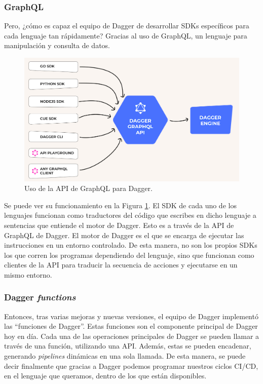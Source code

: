 \subsubsection*{GraphQL}

Pero, ¿cómo es capaz el equipo de Dagger de desarrollar SDKs específicos para cada lenguaje tan rápidamente? Gracias al uso de GraphQL\cite{graphql}, un lenguaje para manipulación y consulta de datos.

\begin{figure}
  \centerline{\includegraphics[width=14cm]{figuras/graphql}}
  \caption{Uso de la API de GraphQL para Dagger.\cite{img:graphql}}
  \label{fig:graphql}
\end{figure}

Se puede ver su funcionamiento en la Figura \ref{fig:graphql}. El SDK de cada uno de los lenguajes funcionan como traductores del código que escribes en dicho lenguaje a sentencias que entiende el motor de Dagger. Esto es a través de la API de GraphQL de Dagger. El motor de Dagger es el que se encarga de ejecutar las instrucciones en un entorno controlado. De esta manera, no son los propios SDKs los que corren los programas dependiendo del lenguaje, sino que funcionan como clientes de la API para traducir la secuencia de acciones y ejecutarse en un mismo entorno.

\subsubsection*{Dagger \textit{functions}}

Entonces, tras varias mejoras y nuevas versiones, el equipo de Dagger implementó las ``funciones de Dagger''. Estas funciones son el componente principal de Dagger hoy en día. Cada una de las operaciones principales de Dagger se pueden llamar a través de una función, utilizando una API. Además, estas se pueden encadenar, generando \textit{pipelines} dinámicas en una sola llamada. De esta manera, se puede decir finalmente que gracias a Dagger podemos programar nuestros ciclos CI/CD, en el lenguaje que queramos, dentro de los que están disponibles.

